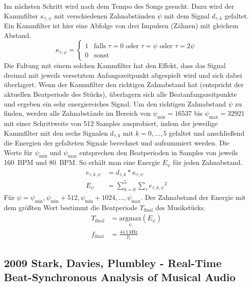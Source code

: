 {{{			%
			Im nächsten Schritt wird nach dem Tempo des Songs gesucht.
			Dazu wird der Kammfilter $\kappa_{\tau, \psi}$ mit verschiedenen Zahnabständen $\psi$ mit dem Signal $d_{\tau, k}$ gefaltet.
			Ein Kammfilter ist hier eine Abfolge von drei Impulsen (Zähnen) mit gleichem Abstand.
			\begin{equation}
				\kappa_{\tau, \psi} =
					\begin{cases}
						1 & \text{falls } \tau = 0 \text{ oder } \tau = \psi \text{ oder } \tau = 2\psi \\
						0 & \text{sonst}
					\end{cases}
			\end{equation}
			Die Faltung mit einem solchen Kammfilter hat den Effekt,
				dass das Signal dreimal mit jeweils versetztem Anfangszeitpunkt abgespielt wird
				und sich dabei überlagert.
			Wenn der Kammfilter den richtigen Zahnabstand hat (entspricht der aktuellen Beatperiode des Stücks),
				überlagern sich alle Beatanfangszeitpunkte
				und ergeben ein sehr energiereiches Signal.
			Um den richtigen Zahnabstand $\psi$ zu finden,
				werden alle Zahnabstände im Bereich von $\psi_\text{min} = \num{16537}$ bis $\psi_\text{max} = \num{32921}$
				mit einer Schrittweite von \num{512} Samples ausprobiert,
				indem der jeweilige Kammfilter mit den sechs Signalen $d_{\tau, k}$ mit $k = 0, ..., 5$ gefaltet
				und anschlie{\ss}end die Energien der gefalteten Signale berechnet und aufsummiert werden.
			Die Werte für $\psi_\text{min}$ und $\psi_\text{max}$ entsprechen den Beatperioden in Samples von jeweils \SI{160}{BPM} und \SI{80}{BPM}.
			So erhält man eine Energie $E_\psi$ für jeden Zahnabstand.
			\begin{align}
				e_{\tau, k, \psi} &= d_{\tau, k} * \kappa_{\tau, \psi} \\
				E_\psi &= \sum_{k = 0}^5 \sum_\tau {e_{\tau, k, \psi}}^2
			\end{align}
			Für $\psi = \psi_\text{min}, \psi_\text{min} + 512, \psi_\text{min} + 1024, ..., \psi_\text{max}$.
			Der Zahnabstand der Energie mit dem grö{\ss}ten Wert bestimmt die Beatperiode $\Upsilon_\text{final}$ des Musikstücks.
			\begin{align}
				\Upsilon_\text{final} &= \underset{\psi}{\text{argmax}}(E_\psi) \\
				f_\text{final} &= \frac{\SI{44.1}{\kilo\hertz}}{\Upsilon_\text{f}}
			\end{align}
		}
	}

	\subsection{2009 Stark, Davies, Plumbley - Real-Time Beat-Synchronous Analysis of Musical Audio}
	{
}}
